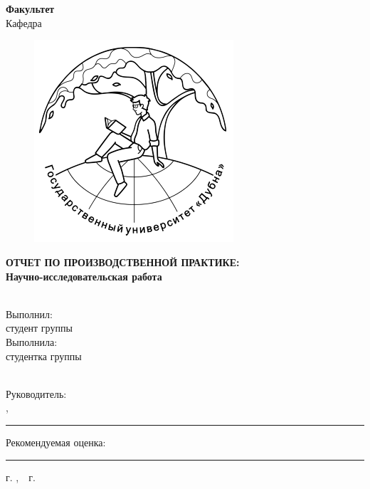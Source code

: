% 
%

\begin{center}
\begin{minipage}{12cm}
\begin{center}
\textbf{\UniversityFirst} \\[-0.1cm]
\end{center}
\end{minipage}

\textbf{\UniversitySecond} \\[-0.1cm]

\textbf{Факультет \AuthorFaculty} \\[-0.1cm]

Кафедра \AuthorDepartment \\[1.cm]

\begin{figure}[H]
\flushright
\includegraphics[width=0.3\linewidth]{img/logo}
\captionsetup{labelformat=empty}
\caption{}
\label{img:Logo}
\end{figure}

\large \textbf{ОТЧЕТ ПО ПРОИЗВОДСТВЕННОЙ ПРАКТИКЕ:} \\[0.1cm]

\textbf{Научно-исследовательская работа} \\[0.1cm]

\Title \\[4.cm]
\end{center} 

\hfill
\begin{minipage}{0.4\linewidth}
\begin{flushright}

\ifdefined\male
{
\small Выполнил: \\
студент группы \AuthorGroup \\
}
\else
{
\small Выполнила: \\
студентка группы \AuthorGroup \\
}
\fi

\AuthorSecond\ \AuthorFirst\ \AuthorThird \\
Руководитель: \\
\SupervisorTitles,\ \SupervisorSecond\ \SupervisorInitials \\

\rule{0.5\linewidth}{0.5pt}

Рекомендуемая оценка: \\

\rule{0.5\linewidth}{0.5pt}

\end{flushright}
\end{minipage}

\vfill
\begin{center} 
\small{г. \City,\ \Year\ г.}
\end{center} 

\thispagestyle{empty}
